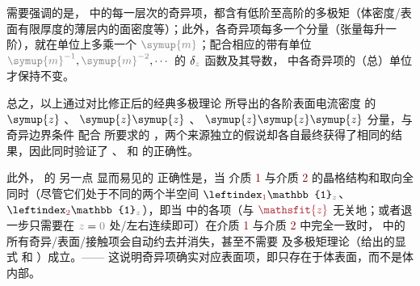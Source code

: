 需要强调的是， 中的每一层次的奇异项，都含有低阶至高阶的多极矩（体密度/表面有限厚度的薄层内的面密度等）；此外，各奇异项每多一个分量（张量每升一阶），就在单位上多乘一个 $\mathcolor{gray}{\symup{m}}$；配合相应的带有单位 $\mathcolor{gray}{\symup{m}^{-1}},\mathcolor{gray}{\symup{m}^{-2}},\cdots$ 的 $\delta_{\mathcolor{gray}{z}}$ 函数及其导数， 中各奇异项的（总）单位才保持不变。

总之，以上通过对比修正后的经典多极理论  所导出的各阶表面电流密度  的 $\symup{z}$ 、 $\symup{z} \symup{z}$ 、 $\symup{z} \symup{z} \symup{z}$ 分量，与奇异边界条件  配合  所要求的 ，两个来源独立的假说却各自最终获得了相同的结果，因此同时验证了  、  和  的正确性。

此外， 的 另一点 显而易见的 正确性是，当 介质 \textcolor{Maroon}{1} 与介质 \textcolor{Maroon}{2} 的晶格结构和取向全同时（尽管它们处于不同的两个半空间 $\leftindex_{\textcolor{Maroon}{1}} {\mathbb{1}}_{\mathcolor{gray}{z}}$、$\leftindex_{\textcolor{Maroon}{2}} {\mathbb{1}}_{\mathcolor{gray}{z}}$），即当  中的各项（与 $\textcolor{Maroon}{\mathsfit{z}}$ 无关地；或者退一步只需要在 $\mathcolor{gray}{z \mathcolor{black}{=} 0}$ 处/左右连续即可）在介质 \textcolor{Maroon}{1} 与介质 \textcolor{Maroon}{2} 中完全一致时， 中的所有奇异/表面/接触项会自动约去并消失，甚至不需要  及多极矩理论（给出的显式  和 ）成立。—— 这说明奇异项确实对应表面项，即只存在于体表面，而不是体内部。

